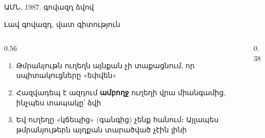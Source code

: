 
\begin{frame}{ԱՄՆ, 1987. գովազդ ձվով}
  \centering
  \par\bigskip
  \raggedright
\end{frame}

\begin{frame}{Լավ գովազդ, վատ գիտություն}
  \begin{columns}[c]
    \begin{column}{0.56\textwidth}
      \begin{enumerate}
        \item Թմրանյութն ուղեղն այնքան չի տաքացնում, որ սպիտակուցները «եփվեն»
        \item<2-> Հազվադեպ է ազդում \textbf{ամբողջ} ուղեղի վրա միանգամից, ինչպես տապակը՝ ձվի
        \item<3-> Եվ ուղեղը «կճեպից» (գանգից) չենք հանում։ Այլապես թմրանյութերն այդքան տարածված չէին լինի
      \end{enumerate}
    \end{column}
    \begin{column}{0.38\textwidth}
    \end{column}
  \end{columns}
\end{frame}

